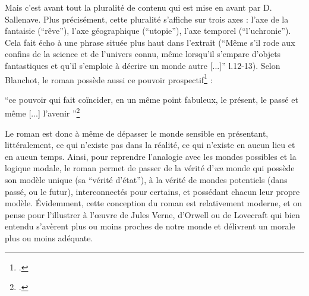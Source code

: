 \documentclass[a4paper,10pt]{article}
\begin{document}
			Mais c'est avant tout la pluralité de contenu qui est mise en avant par D. Sallenave. Plus précisément, cette pluralité s'affiche sur trois axes : l'axe de la fantaisie (``rêve''), l'axe géographique (``utopie''), l'axe temporel (``l'uchronie''). Cela fait écho à une phrase située plus haut dans l'extrait (``Même s'il rode aux confins de la science et de l'univers connu, même lorsqu'il s'empare d'objets fantastiques et qu'il s'emploie à décrire un monde autre [...]'' l.12-13). Selon Blanchot, le roman possède aussi ce pouvoir prospectif\footcite{Blanchot1959} :
			\begin{center}
				\footnotesize
				\begin{minipage}{0.7\textwidth}
					``ce pouvoir qui fait coïncider, en un même point fabuleux, le présent, le passé et même [...] l'avenir ''\footcite[p.~25]{Blanchot1959}
				\end{minipage}
			\end{center}
			Le roman est donc à même de dépasser le monde sensible en présentant, littéralement, ce qui n'existe pas dans la réalité, ce qui n'existe en aucun lieu et en aucun temps. Ainsi, pour reprendre l'analogie avec les  mondes possibles et la logique modale, le roman permet de passer de la vérité d'\textit{un} monde qui possède son modèle unique (sa ``vérité d'état''), à la vérité de mondes potentiels (dans passé, ou le futur), interconnectés pour certains, et possédant chacun leur propre modèle. Évidemment, cette conception du roman est relativement moderne, et on pense pour l'illustrer à l'œuvre de Jules Verne, d'Orwell ou de Lovecraft qui bien entendu s'avèrent plus ou moins proches de notre monde et délivrent un morale plus ou moins adéquate.
\end{document}
